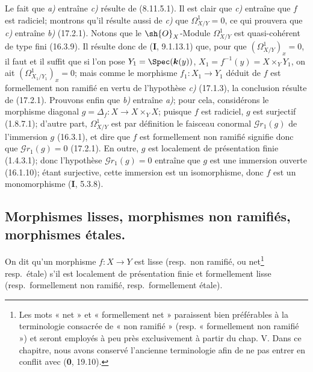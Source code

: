 Le fait que \emph{a)} entraîne \emph{c)} résulte de (8.11.5.1). Il est clair que \emph{c)} entraîne que $f$ est radiciel; montrons qu'il résulte aussi de \emph{c)} que $\varOmega_{X/Y}^1=0$, ce qui prouvera que \emph{c)} entraîne \emph{b)} (17.2.1). Notons que le $\sh{O}_X$-Module $\varOmega_{X/Y}^1$ est quasi-cohérent de type fini (16.3.9). Il résulte donc de (\textbf{I}, 9.1.13.1) que, pour que $(\varOmega_{X/Y}^1)_x=0$, il faut et il suffit que si l'on pose $Y_1=\Spec(\boldsymbol{k}(y))$, $X_1=f^{-1}(y)=X\times_Y Y_1$, on ait $(\varOmega_{X_1/Y_1}^1)_x=0$; mais comme le morphisme $f_1:X_1\to Y_1$ déduit de $f$ est formellement non ramifié en vertu de l'hypothèse \emph{c)} (17.1.3), la conclusion résulte de (17.2.1). Prouvons enfin que \emph{b)} entraîne \emph{a)}; pour cela, considérons le morphisme diagonal $g=\Delta_f:X\to X\times_Y X$; puisque $f$ est radiciel, $g$ est surjectif (1.8.7.1); d'autre part, $\varOmega_{X/Y}^1$ est par définition le faisceau conormal $\mathscr{G}r_1(g)$ de l'immersion $g$ (16.3.1), et dire que $f$ est formellement non ramifié signifie donc que
$\mathscr{G}r_1(g)=0$ (17.2.1). En outre, $g$ est localement de présentation finie (1.4.3.1); donc l'hypothèse $\mathscr{G}r_1(g)=0$ entraîne que $g$ est une immersion ouverte (16.1.10); étant surjective, cette immersion est un isomorphisme, donc $f$ est un monomorphisme (\textbf{I}, 5.3.8).

\subsection{Morphismes lisses, morphismes non ramifiés, morphismes étales.}

\begin{definition}[17.3.1]
On dit qu'un morphisme $f:X\to Y$ est lisse \textup{(resp.}\ non ramifié, \textup{ou} net\footnote{Les mots « net » et « formellement net » paraissent bien préférables à la terminologie consacrée de « non ramifié » (resp. « formellement non ramifié ») et seront employés à peu près exclusivement à partir du chap. V. Dans ce chapitre, nous avons conservé l'ancienne terminologie afin de ne pas entrer en conflit avec (\textbf{0}, 19.10).} \textup{resp.}\ étale\textup{)} s'il est localement de présentation finie et formellement lisse \textup{(resp.}\ formellement non ramifié, \textup{resp.}\ formellement étale\textup{)}.
\end{definition}

